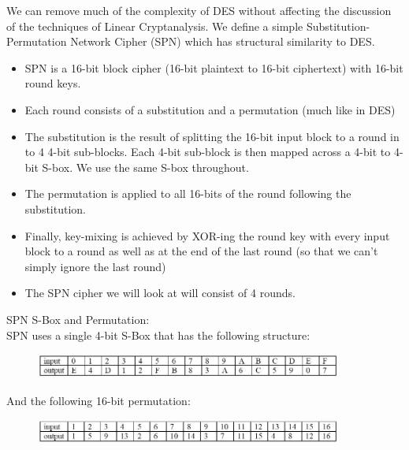 \documentclass[9pt]{beamer}
\begin{document}
\begin{frame}
We can remove much of the complexity of DES without affecting the discussion of the techniques of Linear Cryptanalysis. We define a simple Substitution-Permutation Network Cipher (SPN) which has structural similarity to DES.

\begin{itemize}
\item SPN is a 16-bit block cipher (16-bit plaintext to 16-bit ciphertext) with 16-bit round keys.
\item Each round consists of a substitution and a permutation (much like in DES)
\item The substitution is the result of splitting the 16-bit input block to a round in to 4 4-bit sub-blocks. Each 4-bit sub-block is then mapped across a 4-bit to 4-bit S-box. We use the same S-box throughout.
\item The permutation is applied to all 16-bits of the round following the substitution.
\item Finally, key-mixing is achieved by XOR-ing the round key with every input block to a round as well as at the end of the last round (so that we can't simply ignore the last round)
\item The SPN cipher we will look at will consist of 4 rounds.
\end{itemize}
\end{frame}

\begin{frame}
SPN S-Box and Permutation:\\
\vspace{5mm}
SPN uses a single 4-bit S-Box that has the following structure:
\begin{figure}
\includegraphics[width=0.9\textwidth]{spn_sbox.jpg}
\end{figure}

\vspace{5mm}
And the following 16-bit permutation:
\begin{figure}
\includegraphics[width=0.9\textwidth]{spn_perm.jpg}
\end{figure}

\vspace{5mm}

\end{frame}
\end{document}
